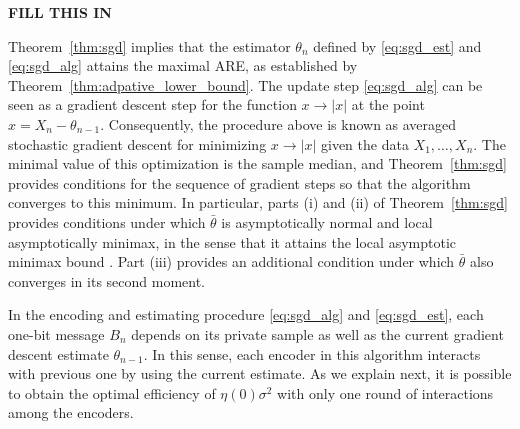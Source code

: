 \textbf{FILL THIS IN}


Theorem~\ref{thm:sgd} implies that the estimator ${\theta}_n$ defined by \eqref{eq:sgd_est} and \eqref{eq:sgd_alg} attains the maximal ARE, as established by Theorem~\ref{thm:adpative_lower_bound}. %
%
The update step \eqref{eq:sgd_alg} can be seen as a gradient descent step for the function $x\to |x|$ at the point $x=X_n - \theta_{n-1}$. Consequently, the procedure above is known as averaged stochastic gradient descent for minimizing $x \to |x|$ given the data $X_1,\ldots,X_n$. The minimal value of this optimization is the sample median, and Theorem~\ref{thm:sgd} provides conditions for the sequence of gradient steps so that the algorithm converges to this minimum. In particular, parts (i) and (ii) of Theorem~\ref{thm:sgd} provides conditions under which $\bar{\theta}$ is asymptotically normal and local asymptotically minimax, in the sense that it attains the local asymptotic minimax bound \cite{van2000asymptotic}. Part (iii) provides an additional condition under which $\bar{\theta}$ also converges in its second moment. 
 \par
In the encoding and estimating procedure \eqref{eq:sgd_alg} and \eqref{eq:sgd_est}, each one-bit message $B_n$ depends on its private sample as well as the current gradient descent estimate $\theta_{n-1}$. In this sense, each encoder in this algorithm interacts with previous one by using the current estimate.
%
As we explain next, 
it is possible to obtain the optimal efficiency of $\eta(0)\sigma^2$ with only one round of interactions among the encoders. 



